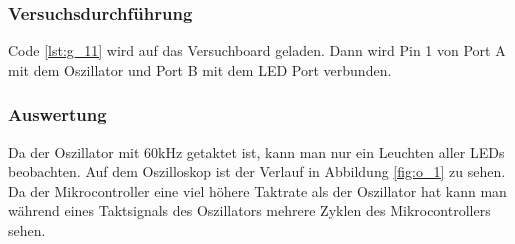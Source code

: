 \documentclass[12pt,a4paper]{article}
\begin{document}
\subsubsection*{Versuchsdurchführung}

Code \ref{lst:g_11} wird auf das Versuchboard geladen. Dann wird Pin 1 von Port A mit dem Oszillator und Port B mit dem LED Port verbunden.

\subsubsection*{Auswertung}

Da der Oszillator mit 60kHz getaktet ist, kann man nur ein Leuchten aller LEDs beobachten. Auf dem Oszilloskop ist der Verlauf in Abbildung \ref{fig:o_1} zu sehen. Da der Mikrocontroller eine viel höhere Taktrate als der Oszillator hat kann man während eines Taktsignals des Oszillators mehrere Zyklen des Mikrocontrollers sehen.
\end{document}
